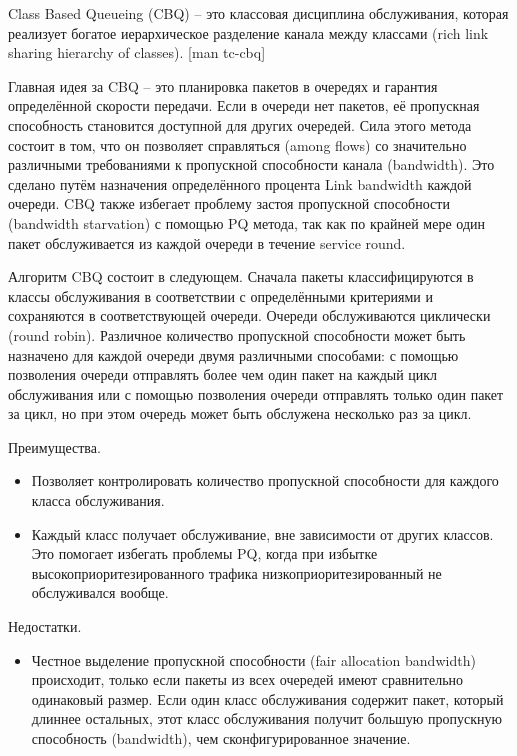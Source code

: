         Class Based Queueing (CBQ) -- это классовая дисциплина обслуживания, которая реализует
        богатое иерархическое разделение канала между классами (rich link sharing hierarchy of
        classes). [man tc-cbq]

        Главная идея за CBQ -- это планировка пакетов в очередях и гарантия определённой
        скорости передачи. Если в очереди нет пакетов, её пропускная способность
        становится доступной для других очередей. Сила этого метода состоит в том, что
        он позволяет справляться (among flows) со значительно различными требованиями
        к пропускной способности канала (bandwidth). Это сделано путём назначения
        определённого процента
        Link bandwidth каждой очереди. CBQ также избегает проблему застоя пропускной способности
        (bandwidth starvation) с помощью PQ метода, так как по крайней мере один пакет обслуживается
        из каждой очереди в течение service round.

        Алгоритм CBQ состоит в следующем. Сначала пакеты классифицируются в классы
        обслуживания в соответствии с определёнными критериями и сохраняются в
        соответствующей очереди. Очереди обслуживаются циклически (round robin). Различное
        количество пропускной способности может быть назначено для каждой очереди
        двумя различными способами: с помощью позволения очереди отправлять более
        чем один пакет на каждый цикл обслуживания или с помощью позволения очереди
        отправлять только один пакет за цикл, но при этом очередь может быть обслужена
        несколько раз за цикл.

        Преимущества.
		\begin{itemize}
        	\item Позволяет контролировать количество пропускной способности для каждого
                класса обслуживания.
        	\item Каждый класс получает обслуживание, вне зависимости от других классов. Это
                помогает избегать проблемы PQ, когда при избытке высокоприоритезированного
                трафика низкоприоритезированный не обслуживался вообще.
		\end{itemize}
        Недостатки.
		\begin{itemize}
            \item Честное выделение пропускной способности (fair allocation bandwidth) происходит, только если
        пакеты из всех очередей имеют сравнительно одинаковый размер. Если один класс
        обслуживания содержит пакет, который длиннее остальных, этот класс обслуживания
        получит большую пропускную способность (bandwidth), чем сконфигурированное значение.
		\end{itemize}

